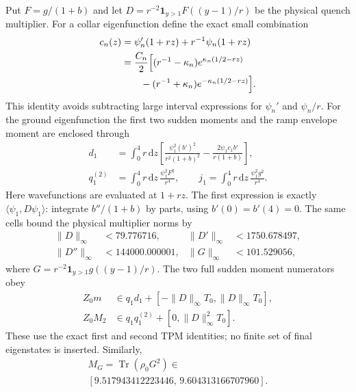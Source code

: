 \documentclass[aps,pra,reprint,superscriptaddress,longbibliography]{revtex4-2}
\newcommand{\dd}{\mathrm d}
\newcommand{\Tr}{\operatorname{Tr}}
\begin{document}
Put $F=g/(1+b)$ and let
$D=r^{-2}\mathbf1_{y>1}F((y-1)/r)$ be the physical quench multiplier.
For a collar eigenfunction define the exact small combination
\begin{align}
 c_n(z)&=\psi_n'(1+rz)+r^{-1}\psi_n(1+rz)\nonumber\\
 &=\frac{C_n}{2}\Bigl[
 (r^{-1}-\kappa_n)e^{\kappa_n(1/2-rz)}
 \nonumber\\
 &\qquad -(r^{-1}+\kappa_n)e^{-\kappa_n(1/2-rz)}
 \Bigr].
 \label{eq:nc-cancellation}
\end{align}
This identity avoids subtracting large interval expressions for
$\psi_n'$ and $\psi_n/r$.
For the ground eigenfunction the first two sudden moments and the ramp
envelope moment are enclosed through
\begin{align}
 d_1&=\int_0^4 r\,\dd z
 \left[\frac{\psi_1^2(b')^2}{r^2(1+b)^2}
       -\frac{2\psi_1c_1b'}{r(1+b)}\right],\nonumber\\
 q_1^{(2)}&=\int_0^4 r\,\dd z\,\frac{\psi_1^2F^2}{r^4},
 \qquad
 j_1=\int_0^4r\,\dd z\,\frac{\psi_1^2g^2}{r^4}.
 \label{eq:nc-matrix}
\end{align}
Here wavefunctions are evaluated at $1+rz$.
The first expression is exactly $\langle\psi_1,D\psi_1\rangle$:
integrate $b''/(1+b)$ by parts, using $b'(0)=b'(4)=0$.
The same cells bound the physical multiplier norms by
\begin{align}
 \|D\|_\infty&<79.776716,&
 \|D'\|_\infty&<1750.678497,\nonumber\\
 \|D''\|_\infty&<144000.000001,&
 \|G\|_\infty&<101.529056,
 \label{eq:nc-norms}
\end{align}
where $G=r^{-2}\mathbf1_{y>1}g((y-1)/r)$.
The two full sudden moment numerators obey
\begin{align}
 Z_0 m&\in q_1 d_1+
       [-\|D\|_\infty T_0,\|D\|_\infty T_0],\nonumber\\
 Z_0 M_2&\in q_1q_1^{(2)}+[0,\|D\|_\infty^2T_0].
 \label{eq:nc-fullmoments}
\end{align}
These use the exact first and second TPM identities; no finite set of
final eigenstates is inserted.
Similarly,
\begin{equation}
 \begin{gathered}
 M_G=\Tr(\rho_0G^2)\in\\
 [9.517943412223446,\,9.604313166707960].
 \end{gathered}
 \label{eq:nc-mg}
\end{equation}
\end{document}
